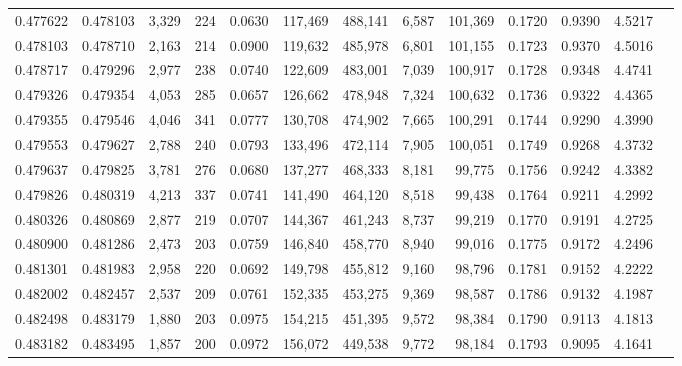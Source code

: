 \begin{tabular}{rrrrrrrrrrrrr}
0.477622 & 0.478103 & 3,329 &   224 &                                     0.0630 & 117,469 & 488,141 &   6,587 & 101,369 & 0.1720 & 0.9390 & 4.5217 \\
0.478103 & 0.478710 & 2,163 &   214 &                                     0.0900 & 119,632 & 485,978 &   6,801 & 101,155 & 0.1723 & 0.9370 & 4.5016 \\
0.478717 & 0.479296 & 2,977 &   238 &                                     0.0740 & 122,609 & 483,001 &   7,039 & 100,917 & 0.1728 & 0.9348 & 4.4741 \\
0.479326 & 0.479354 & 4,053 &   285 &                                     0.0657 & 126,662 & 478,948 &   7,324 & 100,632 & 0.1736 & 0.9322 & 4.4365 \\
0.479355 & 0.479546 & 4,046 &   341 &                                     0.0777 & 130,708 & 474,902 &   7,665 & 100,291 & 0.1744 & 0.9290 & 4.3990 \\
0.479553 & 0.479627 & 2,788 &   240 &                                     0.0793 & 133,496 & 472,114 &   7,905 & 100,051 & 0.1749 & 0.9268 & 4.3732 \\
0.479637 & 0.479825 & 3,781 &   276 &                                     0.0680 & 137,277 & 468,333 &   8,181 &  99,775 & 0.1756 & 0.9242 & 4.3382 \\
0.479826 & 0.480319 & 4,213 &   337 &                                     0.0741 & 141,490 & 464,120 &   8,518 &  99,438 & 0.1764 & 0.9211 & 4.2992 \\
0.480326 & 0.480869 & 2,877 &   219 &                                     0.0707 & 144,367 & 461,243 &   8,737 &  99,219 & 0.1770 & 0.9191 & 4.2725 \\
0.480900 & 0.481286 & 2,473 &   203 &                                     0.0759 & 146,840 & 458,770 &   8,940 &  99,016 & 0.1775 & 0.9172 & 4.2496 \\
0.481301 & 0.481983 & 2,958 &   220 &                                     0.0692 & 149,798 & 455,812 &   9,160 &  98,796 & 0.1781 & 0.9152 & 4.2222 \\
0.482002 & 0.482457 & 2,537 &   209 &                                     0.0761 & 152,335 & 453,275 &   9,369 &  98,587 & 0.1786 & 0.9132 & 4.1987 \\
0.482498 & 0.483179 & 1,880 &   203 &                                     0.0975 & 154,215 & 451,395 &   9,572 &  98,384 & 0.1790 & 0.9113 & 4.1813 \\
0.483182 & 0.483495 & 1,857 &   200 &                                     0.0972 & 156,072 & 449,538 &   9,772 &  98,184 & 0.1793 & 0.9095 & 4.1641 \\

\end{tabular}
